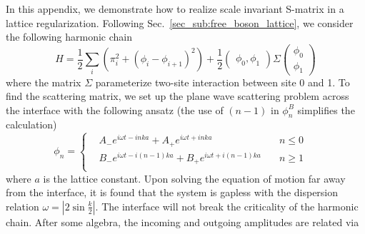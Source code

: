 In this appendix, we demonstrate how to realize scale invariant S-matrix in a lattice regularization. Following Sec.~\ref{sec_sub:free_boson_lattice}, we consider the following harmonic chain 
\begin{equation}
H = \frac{1}{2} \sum_i \left(\pi_i^2  + ( \phi_i - \phi_{i+1} )^2 \right) +  \frac{1}{2} \begin{pmatrix}  \phi_0, \phi_1 \end{pmatrix}
\Sigma
\begin{pmatrix}
\phi_0 \\
\phi_1 
\end{pmatrix}
\end{equation}
where the matrix $\Sigma$ parameterize two-site interaction between site 0 and 1. To find the scattering matrix, we set up the plane wave scattering problem across the interface with the following ansatz (the use of $(n-1)$ in $\phi_n^B$ simplifies the calculation)
\begin{equation}
\label{eq:ansatz}
\phi_n
= \left\lbrace
  \begin{aligned}
	& A_{-} e^{i \omega t  - inka}  + A_{+} e^{i \omega t  + inka}  & \quad  n \le 0 \\
	& B_{-} e^{i \omega t  - i(n-1)ka}  + B_{+} e^{i \omega t  + i(n-1)ka} & \quad n \ge 1 \\
  \end{aligned} \right. 
 \quad 
\end{equation}
where $a$ is the lattice constant. Upon solving the equation of motion far away from the interface, it is found that the system is gapless with the dispersion relation $\omega = \left|2\sin\frac{k}{2}\right|$. The interface will not break the criticality of the harmonic chain\cite{peschel_exact_2012}. After some algebra, the incoming and outgoing amplitudes are related via
